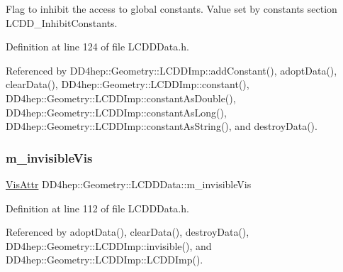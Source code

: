 Flag to inhibit the access to global constants. Value set by constants section \textquotesingle{}L\+C\+D\+D\+\_\+\+Inhibit\+Constants\textquotesingle{}. 



Definition at line 124 of file L\+C\+D\+D\+Data.\+h.



Referenced by D\+D4hep\+::\+Geometry\+::\+L\+C\+D\+D\+Imp\+::add\+Constant(), adopt\+Data(), clear\+Data(), D\+D4hep\+::\+Geometry\+::\+L\+C\+D\+D\+Imp\+::constant(), D\+D4hep\+::\+Geometry\+::\+L\+C\+D\+D\+Imp\+::constant\+As\+Double(), D\+D4hep\+::\+Geometry\+::\+L\+C\+D\+D\+Imp\+::constant\+As\+Long(), D\+D4hep\+::\+Geometry\+::\+L\+C\+D\+D\+Imp\+::constant\+As\+String(), and destroy\+Data().

\hypertarget{class_d_d4hep_1_1_geometry_1_1_l_c_d_d_data_a081b9cb2c89e1b884993c83f78c2c257}{}\label{class_d_d4hep_1_1_geometry_1_1_l_c_d_d_data_a081b9cb2c89e1b884993c83f78c2c257} 
\subsubsection{\texorpdfstring{m\+\_\+invisible\+Vis}{m\_invisibleVis}}
{\footnotesize\ttfamily \hyperlink{class_d_d4hep_1_1_geometry_1_1_vis_attr}{Vis\+Attr} D\+D4hep\+::\+Geometry\+::\+L\+C\+D\+D\+Data\+::m\+\_\+invisible\+Vis\hspace{0.3cm}{\ttfamily [protected]}}



Definition at line 112 of file L\+C\+D\+D\+Data.\+h.



Referenced by adopt\+Data(), clear\+Data(), destroy\+Data(), D\+D4hep\+::\+Geometry\+::\+L\+C\+D\+D\+Imp\+::invisible(), and D\+D4hep\+::\+Geometry\+::\+L\+C\+D\+D\+Imp\+::\+L\+C\+D\+D\+Imp().

\hypertarget{class_d_d4hep_1_1_geometry_1_1_l_c_d_d_data_afa9101d1b35276686f9a11f6e0893d0f}{}\label{class_d_d4hep_1_1_geometry_1_1_l_c_d_d_data_afa9101d1b35276686f9a11f6e0893d0f} 
